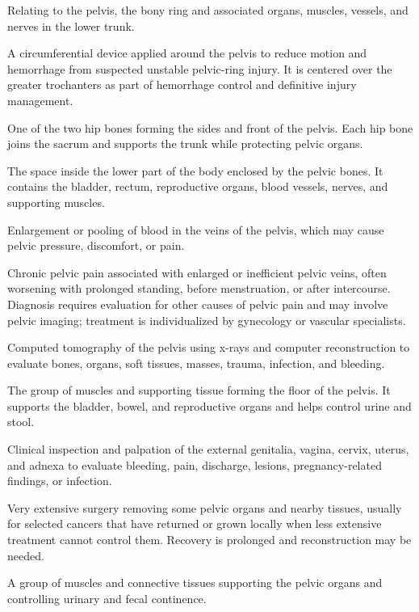  Relating to the pelvis, the bony ring and associated organs, muscles, vessels, and nerves in the lower trunk.

 A circumferential device applied around the pelvis to reduce motion and hemorrhage from
suspected unstable pelvic-ring injury. It is centered over the greater
trochanters as part of hemorrhage control and definitive injury management.

 One of the two hip bones forming the sides and front of the pelvis. Each hip bone joins the sacrum and supports the trunk while protecting pelvic organs.

 The space inside the lower part of the body enclosed by the pelvic bones. It contains the bladder, rectum, reproductive organs, blood vessels, nerves, and supporting muscles.

 Enlargement or pooling of blood in the veins of the pelvis, which may cause pelvic pressure, discomfort, or pain.

 Chronic pelvic pain associated with enlarged or inefficient pelvic veins, often worsening with prolonged standing,
before menstruation, or after intercourse. Diagnosis requires evaluation for other causes of pelvic pain and may
involve pelvic imaging; treatment is individualized by gynecology or vascular specialists.

 Computed tomography of the pelvis using x-rays and computer reconstruction to evaluate bones, organs, soft tissues, masses, trauma, infection, and bleeding.

 The group of muscles and supporting tissue forming the floor of the pelvis. It supports the bladder, bowel, and reproductive organs and helps control urine and stool.

 Clinical inspection and palpation of the external genitalia, vagina, cervix, uterus, and adnexa to evaluate bleeding, pain, discharge, lesions, pregnancy-related findings, or infection.

 Very extensive surgery removing some pelvic organs and nearby tissues, usually for selected cancers that have returned or grown locally when less extensive treatment cannot control them. Recovery is prolonged and reconstruction may be needed.

 A group of muscles and connective tissues supporting the pelvic organs and controlling urinary and fecal continence.

